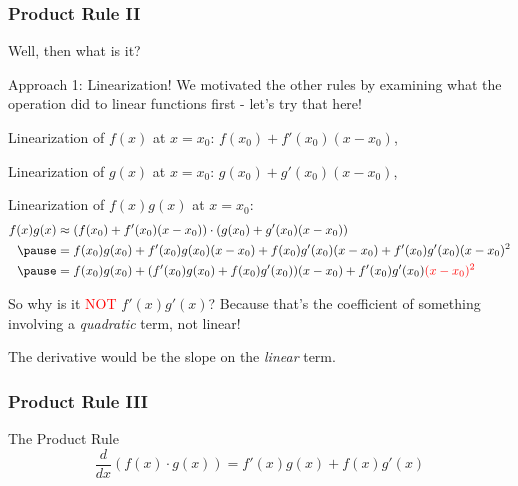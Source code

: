 \documentclass{ltx-talk}
\begin{document}
\begin{frame}
  \frametitle{Product Rule II}

  Well, then what is it? \pause

  Approach 1: Linearization! \pause
  We motivated the other rules by examining what the operation did to linear functions first - let's try that here! \pause

  Linearization of $f(x)$ at $x = x_0$: $f(x_0) + f'(x_0)(x - x_0)$,

  Linearization of $g(x)$ at $x = x_0$: $g(x_0) + g'(x_0)(x - x_0)$, \pause

  Linearization of $f(x)g(x)$ at $x = x_0$:
  \begin{align}
    f(x)g(x) &\approx (f(x_0) + f'(x_0)(x - x_0)) \cdot (g(x_0) + g'(x_0)(x - x_0)) \\ \pause
             &= f(x_0)g(x_0) + f'(x_0)g(x_0)(x - x_0) + f(x_0)g'(x_0)(x - x_0) + f'(x_0)g'(x_0)(x - x_0)^2 \\ \pause
             &= f(x_0)g(x_0) + (f'(x_0)g(x_0) + f(x_0)g'(x_0))(x - x_0) + f'(x_0)g'(x_0)\color{red}{(x-x_0)^2}
  \end{align} \pause

  So why is it \textcolor{red}{NOT} $f'(x)g'(x)$? \pause Because that's the coefficient of something involving a \textit{quadratic} term, not linear! \pause

  The derivative would be the slope on the \textit{linear} term.
\end{frame}

\begin{frame}
  \frametitle{Product Rule III}

  \begin{alertblock}{The Product Rule}
    \begin{equation}
      \dfrac{d}{dx}(f(x) \cdot g(x)) = f'(x)g(x) + f(x)g'(x)
    \end{equation}
  \end{alertblock}

\end{frame}
\end{document}
